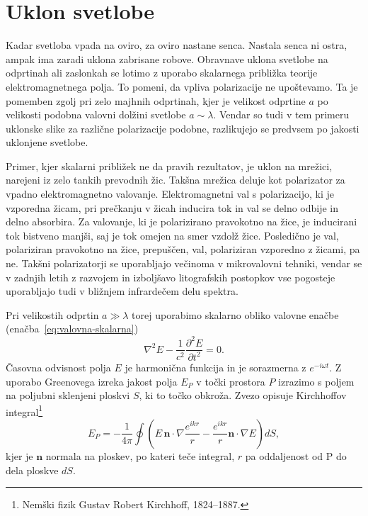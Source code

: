 \section{Uklon svetlobe}
Kadar svetloba vpada na oviro, za oviro nastane senca. Nastala senca ni ostra, ampak
ima zaradi uklona zabrisane robove. Obravnave 
uklona svetlobe na odprtinah ali zaslonkah se lotimo z uporabo
skalarnega približka teorije elektromagnetnega polja. To pomeni, da vpliva 
polarizacije ne upoštevamo. Ta je pomemben zgolj pri zelo majhnih odprtinah, 
kjer je velikost odprtine $a$ po velikosti podobna valovni dolžini svetlobe $a \sim \lambda$. 
Vendar so tudi v tem primeru uklonske slike za različne polarizacije podobne, 
razlikujejo se predvsem po jakosti uklonjene svetlobe.
\begin{remark}
Primer, kjer skalarni približek ne da pravih rezultatov, je uklon na mrežici, narejeni 
iz zelo tankih prevodnih žic. Takšna mrežica deluje kot polarizator za vpadno elektromagnetno valovanje.
Elektromagnetni val s polarizacijo, ki je vzporedna žicam, pri prečkanju v žicah inducira tok
in val se delno odbije in delno absorbira. Za valovanje, ki je polarizirano pravokotno 
na žice, je  inducirani tok bistveno manjši, saj je tok omejen na smer
vzdolž žice. Posledično je val, polariziran pravokotno na žice, prepuščen, 
val, polariziran vzporedno z žicami, pa ne. 
Takšni polarizatorji se uporabljajo večinoma v mikrovalovni tehniki, 
vendar se v zadnjih letih z razvojem in izboljšavo litografskih postopkov
vse pogosteje uporabljajo tudi v bližnjem infrardečem delu spektra.
\end{remark}

Pri velikostih odprtin $a\gg\lambda$ torej uporabimo skalarno obliko valovne enačbe 
(enačba~\ref{eq:valovna-skalarna})
\begin{equation}
\nabla^2 E - \frac{1}{c^2}\frac{\partial^2 E}{\partial t^2} = 0.
\label{eq:skalarna-valovna-enačba}
\end{equation}
Časovna odvisnost polja $E$ je harmonična funkcija in 
je sorazmerna z $e^{-i \omega t}$. Z uporabo Greeno\-ve\-ga izreka 
jakost polja $E_P$ v točki prostora $P$ izrazimo s poljem na 
poljubni sklenjeni ploskvi $S$, ki to točko obkroža. 
Zvezo opisuje Kirchhoffov integral\footnote{Nemški fizik Gustav Robert Kirchhoff, 1824--1887.} 
\begin{equation}
E_P = -\frac{1}{4\pi}\oint \left(E\,\mathbf{n}\cdot \nabla \frac{e^{ikr}}{r}-
\frac{e^{ikr}}{r}\mathbf{n}\cdot \nabla E \right) dS,
\label{eq:Kirchhoffov-integral}
\end{equation}
kjer je $\mathbf{n}$ normala na ploskev, po kateri teče integral, $r$ pa oddaljenost od P
do dela ploskve $dS$. 

